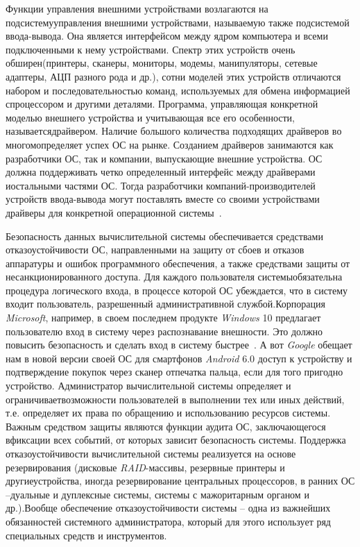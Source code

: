 Функции управления внешними устройствами возлагаются на подсистемууправления внешними устройствами, называемую также подсистемой ввода-вывода.   Она   является   интерфейсом   между   ядром   компьютера   и   всеми подключенными к нему устройствами. Спектр этих устройств очень обширен(принтеры, сканеры, мониторы, модемы, манипуляторы, сетевые адаптеры, АЦП разного рода и др.), сотни моделей этих устройств отличаются набором и последовательностью   команд,   используемых   для   обмена   информацией   спроцессором   и   другими   деталями.   Программа,   управляющая   конкретной моделью внешнего устройства и учитывающая все его особенности, называетсядрайвером. Наличие большого количества подходящих драйверов во многомопределяет   успех   ОС   на   рынке.   Созданием   драйверов   занимаются   как разработчики ОС, так и компании, выпускающие внешние устройства. ОС должна поддерживать четко определенный интерфейс между драйверами иостальными   частями   ОС.   Тогда   разработчики   компаний-производителей устройств ввода-вывода могут поставлять вместе со своими устройствами драйверы для конкретной операционной системы~\cite{Oc2}.

Безопасность   данных   вычислительной   системы   обеспечивается средствами отказоустойчивости ОС, направленными на защиту от сбоев и отказов аппаратуры и ошибок программного обеспечения, а также средствами защиты от несанкционированного доступа. Для каждого пользователя системыобязательна процедура логического входа, в процессе которой ОС убеждается, что в систему входит пользователь, разрешенный административной службой.Корпорация  \textit{Microsoft}, например, в своем последнем продукте  \textit{Windows} 10 предлагает пользователю вход в систему через распознавание внешности. Это должно повысить безопасность и сделать вход в систему быстрее~\cite{linuxOffDoc}. А вот  \textit{Google}  обещает нам в новой версии своей ОС для смартфонов \textit{Android}  6.0  доступ   к   устройству  и   подтверждение   покупок   через   сканер отпечатка пальца, если для того пригодно устройство. Администратор   вычислительной   системы   определяет   и   ограничиваетвозможности   пользователей   в   выполнении   тех   или   иных   действий,   т.е. определяет   их   права   по   обращению   и   использованию   ресурсов   системы. Важным средством защиты являются функции аудита ОС, заключающегося вфиксации всех событий, от которых зависит безопасность системы. Поддержка отказоустойчивости   вычислительной   системы   реализуется   на   основе резервирования   (дисковые   \textit{RAID}-массивы,   резервные   принтеры   и   другиеустройства, иногда резервирование центральных процессоров, в ранних ОС –дуальные и дуплексные системы, системы с мажоритарным органом и др.).Вообще   обеспечение   отказоустойчивости   системы   –   одна   из   важнейших обязанностей системного администратора, который для этого использует ряд специальных средств и инструментов.~\cite{Oc2}

